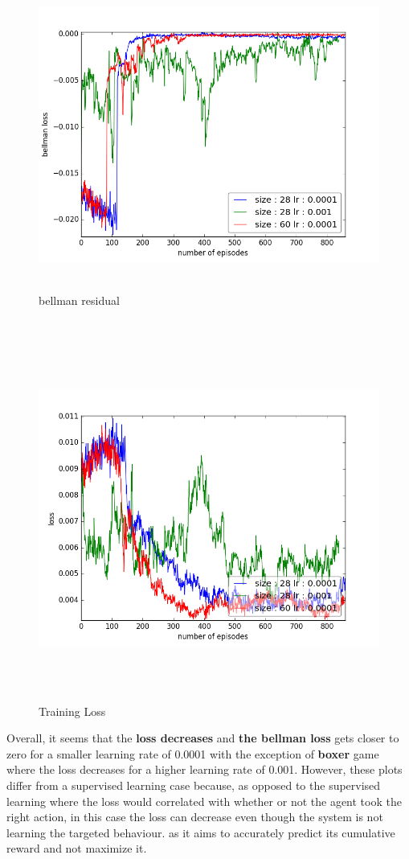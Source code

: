 \documentclass{report}
\begin{document}
\begin{figure}[H]
    \begin{minipage}[c]{.49\linewidth}
        \centering
        \includegraphics[width = \linewidth]{plots/b3/Pong-v3/bellmanLossArray.png}
        \caption{bellman residual}
    \end{minipage}
    \hfill%
    \begin{minipage}[c]{.49\linewidth}
        \centering
        \includegraphics[width = \linewidth]{plots/b3/Pong-v3/lossArray.png}
        \caption{Training Loss}
    \end{minipage}
\end{figure}


Overall, it seems that the \textbf{loss decreases} and \textbf{the bellman loss} gets closer to zero for a smaller learning rate of 0.0001 with the exception of \textbf{boxer} game where the loss decreases for a higher learning rate of 0.001. However, these plots differ from a supervised learning case because, as opposed to the supervised learning where the loss would correlated with whether or not the agent took the right action, in this case the loss can decrease even though the system is not learning the targeted behaviour. as it aims to accurately predict its cumulative reward and not maximize it.
\end{document}
